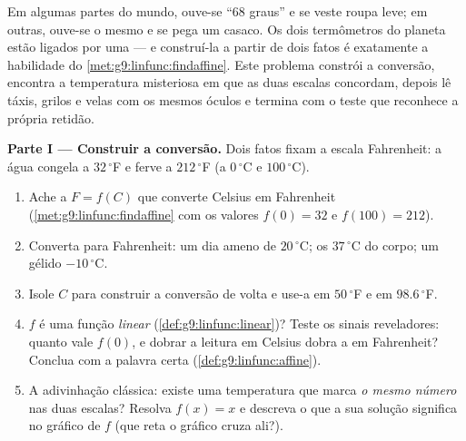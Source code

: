 \begin{problem}
\label{pb:g9:linfunc:1}
Em algumas partes do mundo, ouve-se ``$68$ graus'' e se veste roupa
leve; em outras, ouve-se o mesmo e se pega um casaco. Os dois
termômetros do planeta estão ligados por uma  --- e
construí-la a partir de dois fatos é exatamente a habilidade do
\cref{met:g9:linfunc:findaffine}. Este problema constrói a conversão,
encontra a temperatura misteriosa em que as duas escalas concordam,
depois lê táxis, grilos e velas com os mesmos óculos e termina com o
teste que reconhece a própria retidão.

\medskip
\noindent\textbf{Parte I --- Construir a conversão.}
Dois fatos fixam a escala Fahrenheit: a água congela a
$32\,^\circ$F e ferve a $212\,^\circ$F (a $0\,^\circ$C e
$100\,^\circ$C).
\begin{enumerate}
  \item Ache a  $F = f(C)$ que converte Celsius em
        Fahrenheit (\cref{met:g9:linfunc:findaffine} com os valores
        $f(0) = 32$ e $f(100) = 212$).
  \item Converta para Fahrenheit: um dia ameno de $20\,^\circ$C; os
        $37\,^\circ$C do corpo; um gélido $-10\,^\circ$C.
  \item Isole $C$ para construir a conversão de volta e use-a em
        $50\,^\circ$F e em $98.6\,^\circ$F.
  \item $f$ é uma função \emph{linear}
        (\cref{def:g9:linfunc:linear})? Teste os sinais reveladores:
        quanto vale $f(0)$, e dobrar a leitura em Celsius dobra a em
        Fahrenheit? Conclua com a palavra certa
        (\cref{def:g9:linfunc:affine}).
  \item A adivinhação clássica: existe uma temperatura que marca
        \emph{o mesmo número} nas duas escalas? Resolva $f(x) = x$ e
        descreva o que a sua solução significa no gráfico de $f$ (que
        reta o gráfico cruza ali?).
\end{enumerate}


\end{problem}
